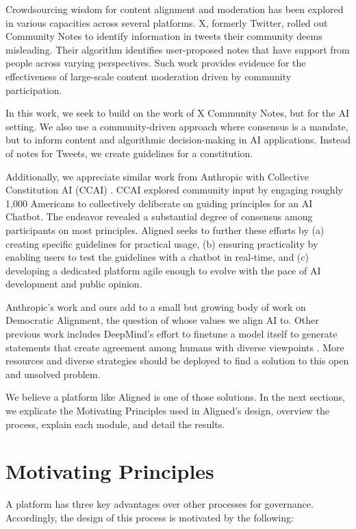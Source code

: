 \documentclass{article}
\begin{document}
\begin{multicols}{2}
Crowdsourcing wisdom for content alignment and moderation has been explored in various capacities across several platforms. X, formerly Twitter, rolled out Community Notes \cite{birdwatch2022} to identify information in tweets their community deems misleading. Their algorithm identifies user-proposed notes that have support from people across varying perspectives. Such work provides evidence for the effectiveness of large-scale content moderation driven by community participation. 

In this work, we seek to build on the work of X Community Notes, but for the AI setting. We also use a community-driven approach where consensus is a mandate, but to inform content and algorithmic decision-making in AI applications. Instead of notes for Tweets, we create guidelines for a constitution.

Additionally, we appreciate similar work from Anthropic with Collective Constitution AI (CCAI) \cite{collectiveConst}. CCAI explored community input by engaging roughly 1,000 Americans to collectively deliberate on guiding principles for an AI Chatbot. The endeavor revealed a substantial degree of consensus among participants on most principles. Aligned seeks to further these efforts by (a) creating specific guidelines for practical usage, (b) ensuring practicality by enabling users to test the guidelines with a chatbot in real-time, and (c) developing a dedicated platform agile enough to evolve with the pace of AI development and public opinion.

Anthropic's work and ours add to a small but growing body of work on Democratic Alignment, the question of whose values we align AI to. Other previous work includes DeepMind's effort to finetune a model itself to generate statements that create agreement among humans with diverse viewpoints \cite{deepmind}. More resources and diverse strategies should be deployed to find a solution to this open and unsolved problem.

We believe a platform like Aligned is one of those solutions. In the next sections, we explicate the Motivating Principles used in Aligned's design, overview the process, explain each module, and detail the results.


\section{Motivating Principles}
A platform has three key advantages over other processes for governance. Accordingly, the design of this process is motivated by the following:


\end{multicols}
\end{document}
